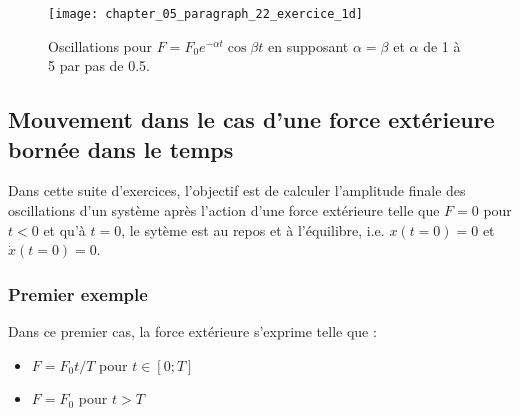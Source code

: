 \begin{figure}[htb!]
	\begin{center}
		\texttt{[image: chapter\_05\_paragraph\_22\_exercice\_1d]}
		\caption{Oscillations pour $F = F_{0}e^{-\alpha t}\cos\beta t$ en supposant $\alpha = \beta$ et $\alpha$ de 1 à 5 par pas de 0.5.}\label{FIG:22_1_d}
	\end{center}
\end{figure}

\subsection{Mouvement dans le cas d'une force ext\'erieure born\'ee dans le temps}

Dans cette suite d'exercices, l'objectif est de calculer l'amplitude finale des oscillations d'un système apr\`es l'action d'une force ext\'erieure telle que $F = 0$ pour $t < 0$ et qu'\`a $t = 0$, le syt\`eme est au repos et \`a l'\'equilibre, i.e. $x(t = 0) = 0$ et $\dot{x}(t = 0) = 0$.

\subsubsection{Premier exemple}

Dans ce premier cas, la force ext\'erieure s'exprime telle que :
\begin{itemize}
	\item $F = F_{0}t/T$ pour $t \in [0;T]$
	\item $F = F_{0}$ pour $t > T$
\end{itemize}

